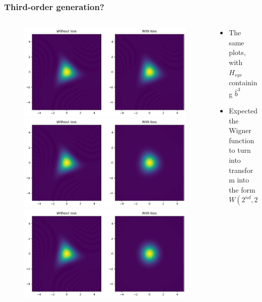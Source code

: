\documentclass{beamer}
\begin{document}
\begin{frame}[c]
  \frametitle{Third-order generation?}
  \begin{columns}
    \begin{column}{0.5\linewidth}
    \begin{figure}
    \includegraphics[width=0.7\linewidth]{third_decay_0.2.png}
    \includegraphics[width=0.7\linewidth]{third_decay_0.5.png}
    \includegraphics[width=0.7\linewidth]{third_decay_1.0.png}
    \end{figure}
    \end{column}
    \begin{column}{0.5\linewidth}
      \begin{itemize}
        \item The same plots, with $H_{sys}$ containing $\hat{b}^{3}$
        \item Expected the Wigner function to turn into transform into the form $W(2^{nd},2^{nd})$
      \end{itemize}
    \end{column}
  \end{columns}
\end{frame}
\end{document}
